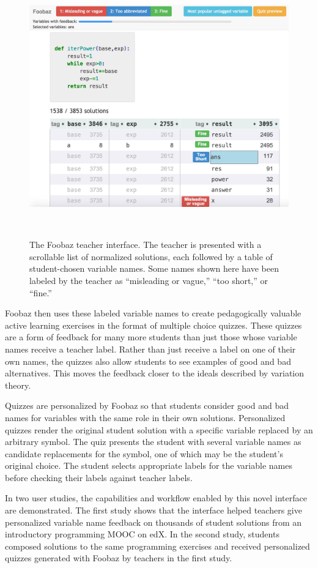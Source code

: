 \begin{figure}
\centering
\includegraphics[width=0.75\linewidth]{Body/figures/foobaz/FoobazInitialView4.jpg}
\caption{The Foobaz teacher interface. The teacher is presented with a scrollable list of normalized solutions, each followed by a table of student-chosen variable names. Some names shown here have been labeled by the teacher as ``misleading or vague,'' ``too short,'' or ``fine.''}
~\label{fig:figure2}
\end{figure}

Foobaz then uses these labeled variable names to create pedagogically valuable active learning exercises in the format of multiple choice quizzes. These quizzes are a form of feedback for many more students than just those whose variable names receive a teacher label. Rather than just receive a label on one of their own names, the quizzes also allow students to see examples of good and bad alternatives. This moves the feedback closer to the ideals described by variation theory.

Quizzes are personalized by Foobaz so that students consider good and bad names for variables with the same role in their own solutions. Personalized quizzes render the original student solution with a specific variable replaced by an arbitrary symbol. The quiz presents the student with several variable names as candidate replacements for the symbol, one of which may be the student's original choice. The student selects appropriate labels for the variable names before checking their labels against teacher labels.

In two user studies, the capabilities and workflow enabled by this novel interface are demonstrated. The first study shows that the interface helped teachers give personalized variable name feedback on thousands of student solutions from an introductory programming MOOC on edX. In the second study, students composed solutions to the same programming exercises and received personalized quizzes generated with Foobaz by teachers in the first study.

